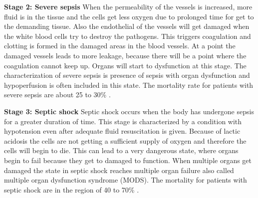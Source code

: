 \textbf{Stage 2: Severe sepsis}
When the permeability of the vessels is increased, more fluid is in the tissue and the cells get less oxygen due to prolonged time for get to the demanding tissue. Also the endothelial of the vessels will get damaged when the white blood cells try to destroy the pathogens. This triggers coagulation and clotting is formed in the damaged areas in the blood vessels. At a point the damaged vessels leads to more leakage, because there will be a point where the coagulation cannot keep up. Organs will start to dysfunction at this stage. The characterization of severe sepsis is presence of sepsis with organ dysfunction and hypoperfusion is often included in this state. The mortality rate for patients with severe sepsis are about 25 to 30\% \cite{baudouin2008,kanta2014}. 


\textbf{Stage 3: Septic shock}
Septic shock occurs when the body has undergone sepsis for a greater duration of time. This stage is characterized by a condition with hypotension even after adequate fluid resuscitation is given. Because of lactic acidosis the cells are not getting a sufficient supply of oxygen and therefore the cells will begin to die. This can lead to a very dangerous state, where organs begin to fail because they get to damaged to function. When multiple organs get damaged the state in septic shock reaches multiple organ failure also called multiple organ dysfunction syndrome (MODS)\cite{baudouin2008,kanta2014}. The mortality for patients with septic shock are in the region of 40 to 70\% \cite{kanta2014}. 


